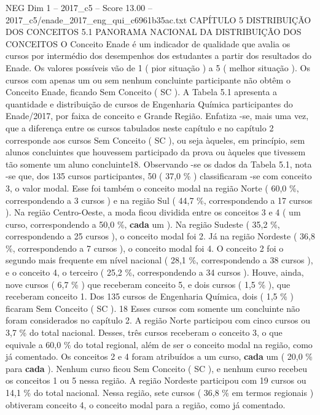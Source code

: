 \begin{textsample}{NEG Dim 1 – 2017\_c5 – Score 13.00 – 2017\_c5/enade\_2017\_eng\_qui\_c6961b35ac.txt}  \label{ex:f1_neg_383}
CAPÍTULO 5 DISTRIBUIÇÃO DOS CONCEITOS 5.1 PANORAMA NACIONAL DA DISTRIBUIÇÃO DOS CONCEITOS O Conceito Enade é um indicador de qualidade que avalia os cursos por intermédio dos desempenhos dos estudantes a partir dos resultados do Enade.
Os valores possíveis vão de 1 ( pior situação ) a 5 ( melhor situação ).
Os cursos com apenas um ou sem nenhum concluinte participante não obtêm o Conceito Enade, ficando Sem Conceito ( SC ).
A Tabela 5.1 apresenta a quantidade e distribuição de cursos de Engenharia Química participantes do Enade/2017, por faixa de conceito e Grande Região.
Enfatiza -se, mais uma vez, que a diferença entre os cursos tabulados neste capítulo e no capítulo 2 corresponde aos cursos Sem Conceito ( SC ), ou seja àqueles, em princípio, sem alunos concluintes que houvessem participado da prova ou àqueles que tivessem tão somente um aluno concluinte18.
Observando -se os dados da Tabela 5.1, nota -se que, dos 135 cursos participantes, 50 ( 37,0 \% ) classificaram -se com conceito 3, o valor modal.
Esse foi também o conceito modal na região Norte ( 60,0 \%, correspondendo a 3 cursos ) e na região Sul ( 44,7 \%, correspondendo a 17 cursos ).
Na região Centro-Oeste, a moda ficou dividida entre os conceitos 3 e 4 ( um curso, correspondendo a 50,0 \%, \textbf{cada} um ).
Na região Sudeste ( 35,2 \%, correspondendo a 25 cursos ), o conceito modal foi 2.
Já na região Nordeste ( 36,8 \%, correspondendo a 7 cursos ), o conceito modal foi 4.
O conceito 2 foi o segundo mais frequente em nível nacional ( 28,1 \%, correspondendo a 38 cursos ), e o conceito 4, o terceiro ( 25,2 \%, correspondendo a 34 cursos ).
Houve, ainda, nove cursos ( 6,7 \% ) que receberam conceito 5, e dois cursos ( 1,5 \% ), que receberam conceito 1.
Dos 135 cursos de Engenharia Química, dois ( 1,5 \% ) ficaram Sem Conceito ( SC ). 18 Esses cursos com somente um concluinte não foram considerados no capítulo 2.
A região Norte participou com cinco cursos ou 3,7 \% do total nacional.
Desses, três cursos receberam o conceito 3, o que equivale a 60,0 \% do total regional, além de ser o conceito modal na região, como já comentado.
Os conceitos 2 e 4 foram atribuídos a um curso, \textbf{cada} um ( 20,0 \% para \textbf{cada} ).
Nenhum curso ficou Sem Conceito ( SC ), e nenhum curso recebeu os conceitos 1 ou 5 nessa região.
A região Nordeste participou com 19 cursos ou 14,1 \% do total nacional.
Nessa região, sete cursos ( 36,8 \% em termos regionais ) obtiveram conceito 4, o conceito modal para a região, como já comentado.

\end{textsample}
